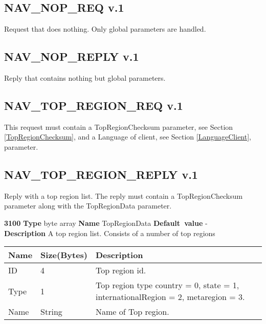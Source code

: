 \documentclass[a4paper]{article}
\begin{document}
\subsection{NAV\_NOP\_REQ v.1}

Request that does nothing. Only global parameters are handled.


\subsection{NAV\_NOP\_REPLY v.1}

Reply that contains nothing but global parameters.


\subsection{NAV\_TOP\_REGION\_REQ v.1}

This request must contain a TopRegionChecksum parameter, see Section 
\ref{TopRegionChecksum}, and a Language of client, see Section 
\ref{LanguageClient}, parameter.


\subsection{NAV\_TOP\_REGION\_REPLY v.1}

Reply with a top region list. The reply must contain a TopRegionChecksum 
parameter along with the TopRegionData parameter.

\begin{list}{\textbf{ParamID}}{}
\item \textbf{3100} \textbf{Type} byte array \textbf{Name} TopRegionData
                 \textbf{Default~value} - \\
  \textbf{Description} A top region list. Consists of a number of top 
  regions

  \begin{tabular}{|l|l|p{60mm}|}
    \hline
    Name   & Size(Bytes) & Description \\\hline
    ID     & 4           & Top region id. \\\hline
    Type   & 1           & Top region type country = 0, state = 1,
                           internationalRegion = 2, metaregion = 3.\\\hline
    Name   & String      & Name of Top region. \\\hline
  \end{tabular}
\end{list}
\end{document}

